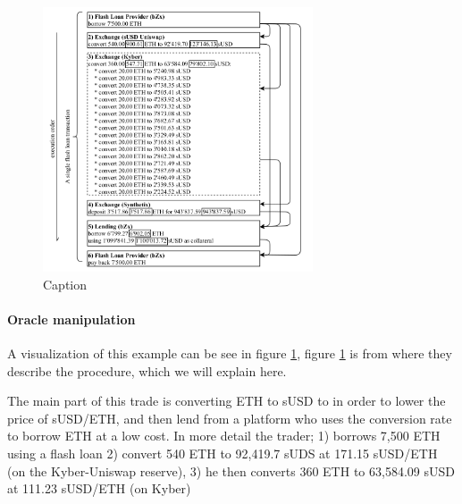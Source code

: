 \begin{figure}
  \centering
  \includegraphics[width=8cm]{assests/oracle}
  \caption{Caption}
  \label{fig:oracle}
\end{figure}
\paragraph{Oracle manipulation} A visualization of this example can be see in figure \ref{fig:oracle}, figure \ref{fig:oracle} is from \cite{attack} where they describe the procedure, which we will explain here.

The main part of this trade is converting ETH to sUSD to in order to lower the price of sUSD/ETH, and then lend from a platform who uses the conversion rate to borrow ETH at a low cost. In more detail the trader; 1) borrows 7,500 ETH using a flash loan 2) convert 540 ETH to 92,419.7 sUDS at 171.15 sUSD/ETH (on the Kyber-Uniswap reserve), 3) he then converts 360 ETH to 63,584.09 sUSD at 111.23 sUSD/ETH (on Kyber)